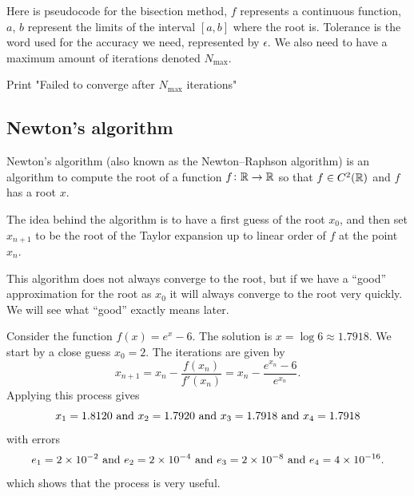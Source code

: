 \documentclass[11pt,a4paper]{article}
\begin{document}
Here is pseudocode for the bisection method, $f$ represents a continuous
function, $a$, $b$ represent the limits of the interval $[a,b]$ where
the root is.
Tolerance is the word used for the accuracy we need, represented by $\epsilon$.
We also need to have a maximum amount of iterations denoted $N_{\text{max}}$.
\begin{algorithm}[H]
\SetAlgoLined
{}



Print "Failed to converge after $N_{\text{max}}$ iterations"\;
\end{algorithm}

\subsection{Newton's algorithm}
Newton's algorithm (also known as the Newton--Raphson algorithm) is an algorithm
to compute the root of a function $f \colon \mathbb{R} \to \mathbb{R}$
so that $f \in C^2(\mathbb{R})$ and $f$ has a root $x$.

The idea behind the algorithm is to have a first guess of the root $x_0$,
and then set $x_{n+1}$ to be the root of the Taylor expansion up to linear
order of $f$ at the point $x_n$.

\begin{remark}
  This algorithm does not always converge to the root,
  but if we have a ``good'' approximation for the root as $x_0$ it will always
  converge to the root very quickly.
  We will see what ``good'' exactly means later.
\end{remark}

\begin{example}
  Consider the function $f(x) = e^x - 6$.
  The solution is $x = \log 6 \approx 1.7918$.
  We start by a close guess $x_0 = 2$.
  The iterations are given by
  \[
    x_{n + 1} =
    x_n - \frac{f(x_n)}{f'(x_n)} =
    x_n - \frac{e^{x_n} - 6}{e^{x_n}}.
  \]
  Applying this process gives
  \[
    x_1 = 1.8120 \text{ and }
    x_2 = 1.7920 \text{ and }
    x_3 = 1.7918 \text{ and }
    x_4 = 1.7918
  \]
  with errors
  \[
    e_1 = 2 \times 10^{-2} \text{ and }
    e_2 = 2 \times 10^{-4} \text{ and }
    e_3 = 2 \times 10^{-8} \text{ and }
    e_4 = 4 \times 10^{-16}.
  \]
  which shows that the process is very useful.
\end{example}
\end{document}
